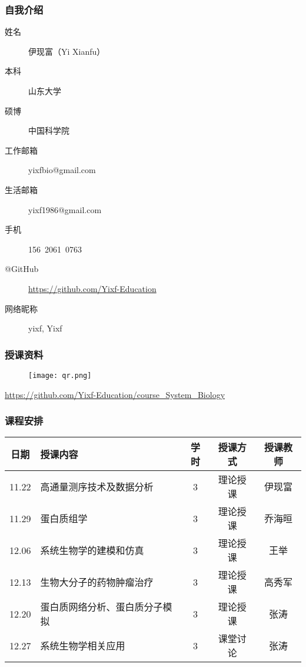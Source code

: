 \begin{frame}
  \frametitle{自我介绍}
    \begin{description}
      \item[姓\qquad 名]伊现富（Yi Xianfu）
      \item[本\qquad 科]山东大学
      \item[硕\qquad 博]中国科学院
      \item[工作邮箱]\alert{yixfbio@gmail.com}
      \item[生活邮箱]yixf1986@gmail.com
      \item[手\qquad 机]\alert{156\ 2061\ 0763}
      \item[@GitHub]\alert{\href{https://github.com/Yixf-Education}{https://github.com/Yixf-Education}}
      \item[网络昵称]yixf, Yixf
    \end{description}
\end{frame}

\begin{frame}
  \frametitle{授课资料}
  \begin{figure}
    \centering
    \texttt{[image: qr.png]}
  \end{figure}
  \begin{center}
  \href{https://github.com/Yixf-Education/course_System_Biology}{https://github.com/Yixf-Education/course\_System\_Biology}
  \end{center}
\end{frame}

\begin{frame}
  \frametitle{课程安排}
  \begin{table}
    \centering
    \begin{tabular}{clccc}
      \hline
      \rowcolor{blue!50}日期 & 授课内容 & 学时 & 授课方式 & 授课教师\\
      \hline
      11.22 & 高通量测序技术及数据分析 & 3 & 理论授课 & 伊现富\\
      11.29 & 蛋白质组学 & 3 & 理论授课 & 乔海晅\\
      12.06 & 系统生物学的建模和仿真 & 3 & 理论授课 & 王举\\
      12.13 & 生物大分子的药物肿瘤治疗 & 3 & 理论授课 & 高秀军\\
      12.20 & 蛋白质网络分析、蛋白质分子模拟 & 3 & 理论授课 & 张涛\\
      12.27 & 系统生物学相关应用 & 3 & 课堂讨论 & 张涛\\
      \hline
    \end{tabular}
  \end{table}
\end{frame}
